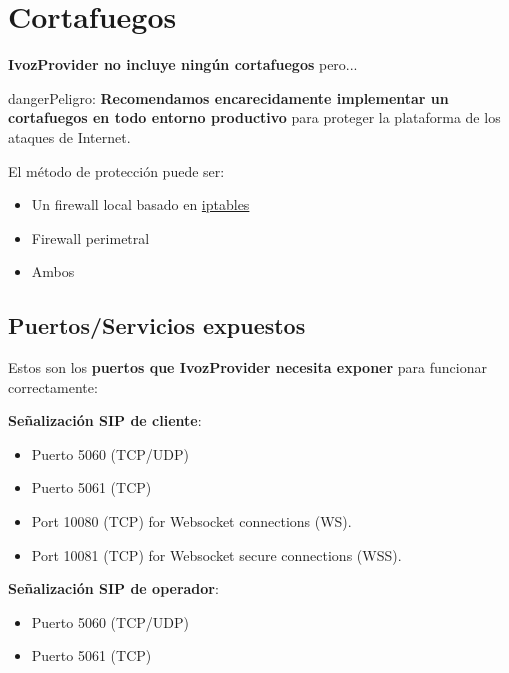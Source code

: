 \documentclass[letterpaper,10pt,spanish]{sphinxmanual}
\begin{document}
\section{Cortafuegos}
\label{security_and_maintenance/security/firewall:firewall}\label{security_and_maintenance/security/firewall::doc}
\textbf{IvozProvider no incluye ningún cortafuegos} pero...

\begin{notice}{danger}{Peligro:}
\textbf{Recomendamos encarecidamente implementar un cortafuegos en todo entorno productivo} para proteger la plataforma de los ataques de Internet.
\end{notice}

El método de protección puede ser:
\begin{itemize}
\item {} 
Un firewall local basado en \href{https://www.netfilter.org/}{iptables}

\item {} 
Firewall perimetral

\item {} 
Ambos

\end{itemize}


\subsection{Puertos/Servicios expuestos}
\label{security_and_maintenance/security/firewall:exposed-ports-services}
Estos son los \textbf{puertos que IvozProvider necesita exponer} para funcionar correctamente:

\textbf{Señalización SIP de cliente}:
\begin{itemize}
\item {} 
Puerto 5060 (TCP/UDP)

\item {} 
Puerto 5061 (TCP)

\item {} 
Port 10080 (TCP) for Websocket connections (WS).

\item {} 
Port 10081 (TCP) for Websocket secure connections (WSS).

\end{itemize}

\textbf{Señalización SIP de operador}:
\begin{itemize}
\item {} 
Puerto 5060 (TCP/UDP)

\item {} 
Puerto 5061 (TCP)

\end{itemize}
\end{document}
